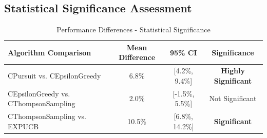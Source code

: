 \documentclass[12pt,a4paper]{article}
\newcommand{\success}[1]{\textcolor{successcolor}{\textbf{#1}}}
\begin{document}
\subsection{Statistical Significance Assessment}

\begin{table}[H]
\centering
\caption{Performance Differences - Statistical Significance}
\begin{tabular}{|l|c|c|c|}
\hline
\textbf{Algorithm Comparison} & \textbf{Mean Difference} & \textbf{95\% CI} & \textbf{Significance} \\
\hline
\hline
CPursuit vs. CEpsilonGreedy & 6.8\% & [4.2\%, 9.4\%] & \success{Highly Significant} \\
CEpsilonGreedy vs. CThompsonSampling & 2.0\% & [-1.5\%, 5.5\%] & Not Significant \\
CThompsonSampling vs. EXPUCB & 10.5\% & [6.8\%, 14.2\%] & \success{Significant} \\
\hline
\end{tabular}
\end{table}
\end{document}
